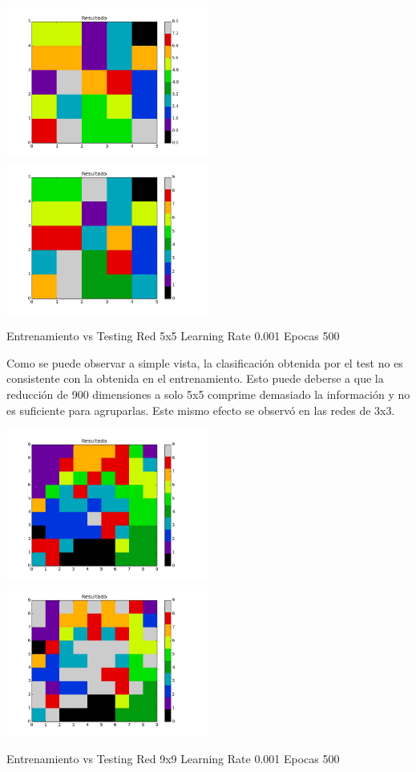 \includegraphics[width=0.5\textwidth]{img/ej2_train_M_5_lrate_001_epocas_500}
\includegraphics[width=0.5\textwidth]{img/ej2_test_M_5_lrate_001_epocas_500}
{\footnotesize Entrenamiento vs Testing Red 5x5 Learning Rate 0.001 Epocas 500\par}

Como se puede observar a simple vista, la clasificaci\'on obtenida por el test no es consistente con la obtenida en el entrenamiento. Esto puede deberse a que la reducci\'on de 900 dimensiones a solo 5x5 comprime demasiado la informaci\'on y no es suficiente para agruparlas. Este mismo efecto se observ\'o en las redes de 3x3.

\includegraphics[width=0.5\textwidth]{img/ej2_train_M_9_lrate_001_epocas_500}
\includegraphics[width=0.5\textwidth]{img/ej2_test_M_9_lrate_001_epocas_500}
{\footnotesize Entrenamiento vs Testing Red 9x9 Learning Rate 0.001 Epocas 500\par}

